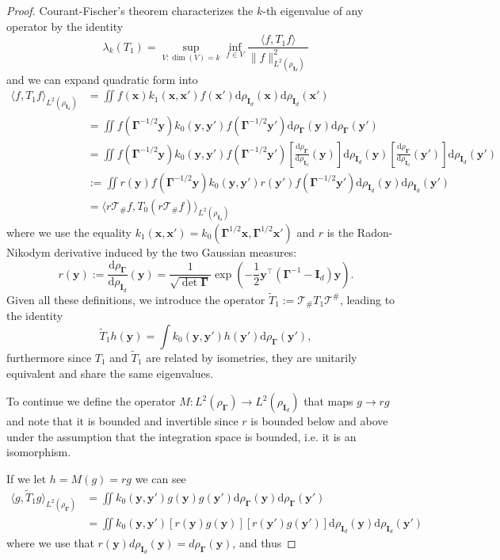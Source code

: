 \begin{proof}
    Courant-Fischer's theorem characterizes the $k$-th eigenvalue of any operator by the identity
    \[
        \lambda_k(T_1) = \sup_{V:\dim(V) = k}\inf_{f\in V}\frac{\langle f, T_1 f\rangle}{\|f\|^2_{L^2(\rho_{\bm I_d})}}
    \]
    and we can expand quadratic form into 
    \begin{align*}
        \langle f, T_1 f\rangle_{L^2(\rho_{\bm I_d})} &= \iint f(\bm x)k_1(\bm x, \bm x')f(\bm x')\mathrm d\rho_{\bm I_d}(\bm x)\mathrm d\rho_{\bm I_d}(\bm x')\\
        &=\iint f(\bm \Gamma^{-1/2}\bm y)k_0(\bm y, \bm y')f(\bm \Gamma^{-1/2}\bm y')\mathrm d\rho_{\bm \Gamma}(\bm y)\mathrm d\rho_{\bm \Gamma}(\bm y')\\
        &=\iint f(\bm \Gamma^{-1/2}\bm y)k_0(\bm y, \bm y')f(\bm \Gamma^{-1/2}\bm y')\left[\frac{\mathrm d\rho_{\bm \Gamma}}{\mathrm d\rho_{\bm I_d}}(\bm y)\right]\mathrm d\rho_{\bm I_d}(\bm y)\left[\frac{\mathrm d\rho_{\bm \Gamma}}{\mathrm d\rho_{\bm I_d}}(\bm y')\right]\mathrm d\rho_{\bm I_d}(\bm y')\\
        &:=\iint r(\bm y)f(\bm \Gamma^{-1/2}\bm y)k_0(\bm y, \bm y')r(\bm y')f(\bm \Gamma^{-1/2}\bm y')\mathrm d\rho_{\bm I_d}(\bm y)\mathrm d\rho_{\bm I_d}(\bm y')\\
        &= \langle r\mathcal T_\# f, T_0 (r\mathcal T_\# f)\rangle_{L^2(\rho_{\bm I_d})}
    \end{align*}
    where we use the equality $k_1(\bm x, \bm x') = k_0(\bm \Gamma^{1/2}\bm x, \bm \Gamma^{1/2}\bm x')$ and $r$ is the Radon-Nikodym derivative induced by the two Gaussian measures:
    \[
        r(\bm y) := \frac{\mathrm d\rho_{\bm \Gamma}}{\mathrm d\rho_{\bm I_d}}(\bm y)= \frac{1}{\sqrt{\det \bm \Gamma}}\exp\left(-\frac{1}{2}\bm y^\top (\bm \Gamma^{-1} - \bm I_d)\bm y\right).
    \]
    Given all these definitions, we introduce the operator $\tilde T_1 := \mathcal T_\# T_1 \mathcal T^\#$, leading to the identity
    \[
        \tilde T_1 h(\bm y) = \int k_0(\bm y, \bm y') h(\bm y') \mathrm d\rho_{\bm \Gamma}(\bm y'),
    \]
    furthermore since $T_1$ and $\tilde T_1$ are related by isometries, they are unitarily equivalent and share the same eigenvalues.
    
    To continue we define the operator $M: L^2(\rho_{\bm \Gamma}) \to L^2(\rho_{\bm I_d})$ that maps $g \to r g$ and note that it is bounded and invertible since $r$ is bounded below and above under the assumption that the integration space is bounded, i.e. it is an isomorphism.
    
    If we let $h = M(g)= r g$ we can see
    \begin{align*}
        \langle g, \tilde T_1 g\rangle_{L^2(\rho_{\bm \Gamma})} &= \iint k_0(\bm y, \bm y')g(\bm y)g(\bm y') \mathrm d\rho_{\bm \Gamma}(\bm y)\mathrm d\rho_{\bm \Gamma}(\bm y')\\
        &= \iint k_0(\bm y, \bm y')[r(\bm y)g(\bm y)][r(\bm y')g(\bm y')] \mathrm d\rho_{\bm I_d}(\bm y)\mathrm d\rho_{\bm I_d}(\bm y')
    \end{align*}
    where we use that $r(\bm y)d\rho_{\bm I_d}(\bm y) = d\rho_{\bm \Gamma}(\bm y)$, and thus
    

\end{proof}
